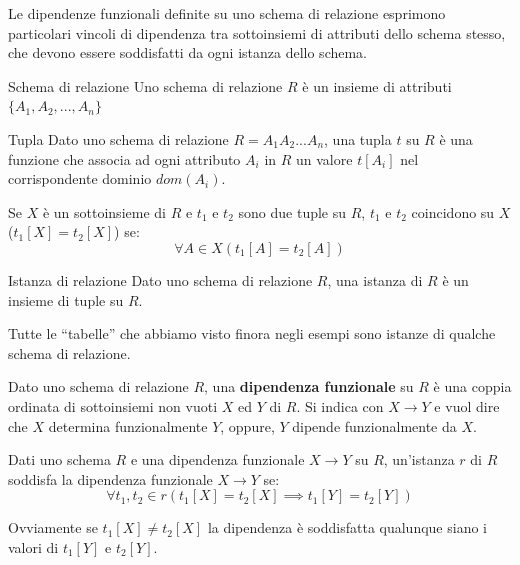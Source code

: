 Le dipendenze funzionali definite su uno schema di relazione esprimono particolari vincoli di dipendenza tra sottoinsiemi di attributi dello schema stesso, che devono essere soddisfatti da ogni istanza dello schema.

\begin{Definition}{Schema di relazione}{}
    Uno schema di relazione $R$ è un insieme di attributi $\{A_1,A_2,...,A_n\}$
\end{Definition}

\begin{Definition}{Tupla}{}
    Dato uno schema di relazione $R=A_1 A_2 ... A_n$, una tupla $t$ su $R$ è una funzione che associa ad ogni attributo $A_i$ in $R$ un valore $t[A_i]$ nel corrispondente dominio $dom(A_i)$.

    Se $X$ è un sottoinsieme di $R$ e $t_1$ e $t_2$ sono due tuple su $R$, $t_1$ e $t_2$ coincidono su $X$ ($t_1[X]=t_2[X]$) se:
    \begin{equation*}
        \forall A\in X(t_1[A]=t_2[A])    
    \end{equation*}    
\end{Definition}

\begin{Definition}{Istanza di relazione}{}
    Dato uno schema di relazione $R$, una istanza di $R$ è un insieme di tuple su $R$.

    Tutte le “tabelle” che abbiamo visto finora negli esempi sono istanze di qualche schema di relazione.
\end{Definition}

\begin{redbar}
    Dato uno schema di relazione $R$, una \textbf{dipendenza funzionale} su $R$ è una coppia ordinata di sottoinsiemi non vuoti $X$ ed $Y$ di $R$. Si indica con $X\to Y$ e vuol dire che $X$ determina funzionalmente $Y$, oppure, $Y$ dipende funzionalmente da $X$.

    Dati uno schema $R$ e una dipendenza funzionale $X\to Y$ su $R$, un'istanza $r$ di $R$ soddisfa la dipendenza funzionale $X\to Y$ se:
    \begin{equation*}
        \forall t_1,t_2\in r(t_1[X]=t_2[X]\implies t_1[Y]=t_2[Y])
    \end{equation*}
    \begin{osservation}
        Ovviamente se $t_1[X]\neq t_2[X]$ la dipendenza è soddisfatta qualunque siano i valori di $t_1[Y]$ e $t_2[Y]$.
    \end{osservation}
\end{redbar}

